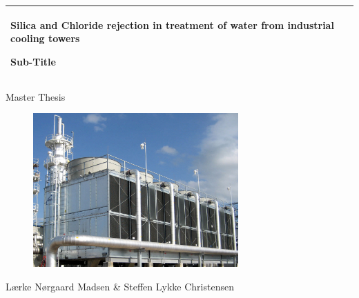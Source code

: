 %
\thispagestyle{empty} %
    \addtolength{\hoffset}{0.5\evensidemargin-0.5\oddsidemargin} %
    \noindent%
    \begin{tabular}{@{}p{\textwidth}@{}}
        \toprule[2pt]
        \midrule
        \vspace{0.2cm}
        \begin{center}
            \huge{
                \textbf{
                    Silica and Chloride rejection in treatment of water from industrial cooling towers%
                }
            }
        \end{center}
        \begin{center}
            \Large{
                Sub-Title%
            }
        \end{center}
        \vspace{0.2cm}\\
        \midrule
        \toprule[2pt]
    \end{tabular}
    \vspace{0 cm}
    \begin{center}
        \huge{
            Master Thesis%
        }\\
        \vspace{0cm}
            \Large{
        }
    \end{center}
    \vspace{2cm}
\begin{figure}[htbp] 
	\centering
	\includegraphics[width=0.7\textwidth]{Billeder/intro/cooling_tower.jpg}
	\caption*{}
	\label{fig:forside}
\end{figure}
    \begin{center}
        \vspace{1cm}
            \large{
        Lærke Nørgaard Madsen \& Steffen Lykke Christensen
        }
    \end{center}
    \vfill
    
\clearpage